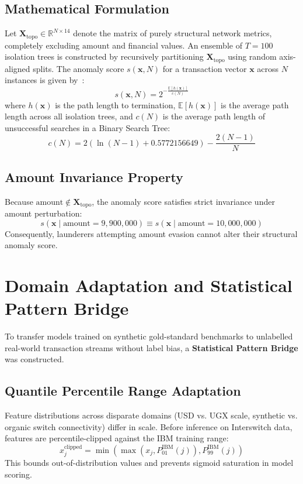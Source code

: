 \subsection{Mathematical Formulation}
Let $\mathbf{X}_{\text{topo}} \in \mathbb{R}^{N \times 14}$ denote the matrix of purely structural network metrics, completely excluding $\text{amount}$ and financial values. An ensemble of $T=100$ isolation trees is constructed by recursively partitioning $\mathbf{X}_{\text{topo}}$ using random axis-aligned splits. The anomaly score $s(\mathbf{x}, N)$ for a transaction vector $\mathbf{x}$ across $N$ instances is given by~\cite{liu2008isolation}:
\begin{equation}
    s(\mathbf{x}, N) = 2^{-\frac{\mathbb{E}[h(\mathbf{x})]}{c(N)}}
\end{equation}
where $h(\mathbf{x})$ is the path length to termination, $\mathbb{E}[h(\mathbf{x})]$ is the average path length across all isolation trees, and $c(N)$ is the average path length of unsuccessful searches in a Binary Search Tree:
\begin{equation}
    c(N) = 2 \left( \ln(N - 1) + 0.5772156649 \right) - \frac{2(N - 1)}{N}
\end{equation}

\subsection{Amount Invariance Property}
Because $\text{amount} \notin \mathbf{X}_{\text{topo}}$, the anomaly score satisfies strict invariance under amount perturbation:
\begin{equation}
    s(\mathbf{x} \mid \text{amount} = 9,900,000) \equiv s(\mathbf{x} \mid \text{amount} = 10,000,000)
\end{equation}
Consequently, launderers attempting amount evasion cannot alter their structural anomaly score.

\section{Domain Adaptation and Statistical Pattern Bridge}
To transfer models trained on synthetic gold-standard benchmarks to unlabelled real-world transaction streams without label bias, a \textbf{Statistical Pattern Bridge} was constructed.

\subsection{Quantile Percentile Range Adaptation}
Feature distributions across disparate domains (USD vs. UGX scale, synthetic vs. organic switch connectivity) differ in scale. Before inference on Interswitch data, features are percentile-clipped against the IBM training range:
\begin{equation}
    x_{j}^{\text{clipped}} = \min\left(\max\left(x_{j}, P_{01}^{\text{IBM}}(j)\right), P_{99}^{\text{IBM}}(j)\right)
\end{equation}
This bounds out-of-distribution values and prevents sigmoid saturation in model scoring.

